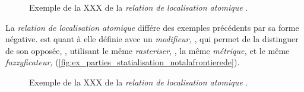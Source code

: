 \begin{figure}
  \centering  
  \caption{Exemple de la XXX de la \emph{relation de localisation
      atomique} \protect{}.}
  \label{fig:ex_parties_statialisation_dansplani}
\end{figure}

La \emph{relation de localisation atomique}
 différe des exemples
précédents par sa forme négative.
%
est quant à elle définie avec un \emph{modifieur,} , qui permet de la distinguer de son opposée, , utilisant le même \emph{rasteriser}, , la même \emph{métrique,}  et le même \emph{fuzzyficateur,}  (\autoref{fig:ex_parties_statialisation_notalafrontierede}).

\begin{figure}
  \centering  
  \caption{Exemple de la XXX de la \emph{relation de localisation
      atomique} \protect{}.}
  \label{fig:ex_parties_statialisation_notalafrontierede}
\end{figure}

